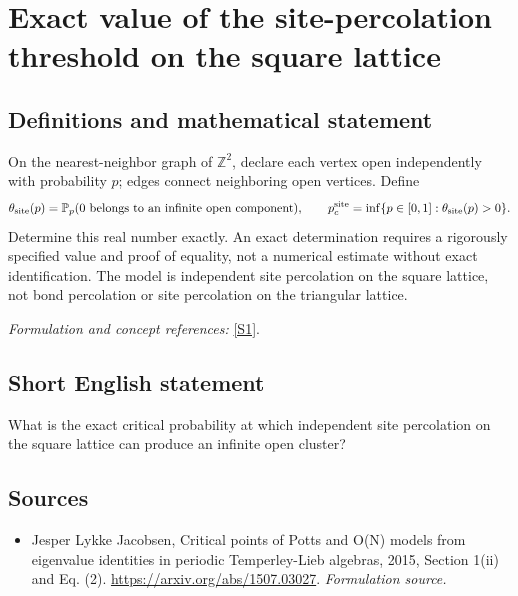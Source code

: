 \documentclass[11pt]{article}
\begin{document}
\section*{\texorpdfstring{Exact value of the site-percolation threshold on the square lattice}{Exact value of the site-percolation threshold on the square lattice}}\label{statement}
\subsection{Definitions and mathematical statement}
On the nearest-neighbor graph of ${\mathbb{Z}}^2$, declare each vertex open independently with probability $p$; edges connect neighboring open vertices. Define
\[
 \theta_{\rm site}(p)={\mathbb{P}}_p(0\text{ belongs to an infinite open component}),
 \qquad
 p_c^{\rm site}=\inf\{p\in[0,1]:\theta_{\rm site}(p)>0\}.
\]
Determine this real number exactly. An exact determination requires a rigorously specified value and proof of equality, not a numerical estimate without exact identification. The model is independent site percolation on the square lattice, not bond percolation or site percolation on the triangular lattice.
\par\smallskip\textit{Formulation and concept references:} \href{https://arxiv.org/abs/1507.03027}{[S1]}.

\subsection{Short English statement}
What is the exact critical probability at which independent site percolation on the square lattice can produce an infinite open cluster?
\subsection{Sources}
\begin{itemize}
\item[S1]Jesper Lykke Jacobsen, Critical points of Potts and O(N) models from eigenvalue identities in periodic Temperley-Lieb algebras, 2015, Section 1(ii) and Eq. (2).
\url{https://arxiv.org/abs/1507.03027}.
\textit{Formulation source.}
\end{itemize}
\end{document}

